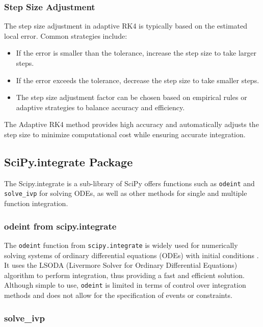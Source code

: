 \documentclass[a4paper,12pt,french]{article}
\begin{document}
\subsubsection*{Step Size Adjustment}

The step size adjustment in adaptive RK4 is typically based on the estimated local error. Common strategies include:

\begin{itemize}
    \item If the error is smaller than the tolerance, increase the step size to take larger steps.
    \item If the error exceeds the tolerance, decrease the step size to take smaller steps.
    \item The step size adjustment factor can be chosen based on empirical rules or adaptive strategies to balance accuracy and efficiency.
\end{itemize}

The Adaptive RK4 method provides high accuracy and automatically adjusts the step size to minimize computational cost while ensuring accurate integration.

\subsection{SciPy.integrate Package}
The Scipy.integrate \cite{SciPy} is a sub-library of SciPy offers functions such as \texttt{odeint} and \texttt{solve\_ivp} for solving ODEs, as well as other methods for single and multiple function integration.

\subsubsection{odeint from scipy.integrate}

The \texttt{odeint} function from \texttt{scipy.integrate} is widely used for numerically solving systems of ordinary differential equations (ODEs) with initial conditions \cite{scipy_ode}. It uses the LSODA \cite{hindmarsh2005lsoda} (Livermore Solver for Ordinary Differential Equations) algorithm to perform integration, thus providing a fast and efficient solution. Although simple to use, \texttt{odeint} is limited in terms of control over integration methods and does not allow for the specification of events or constraints.
\subsubsection{solve\_ivp}
\end{document}
